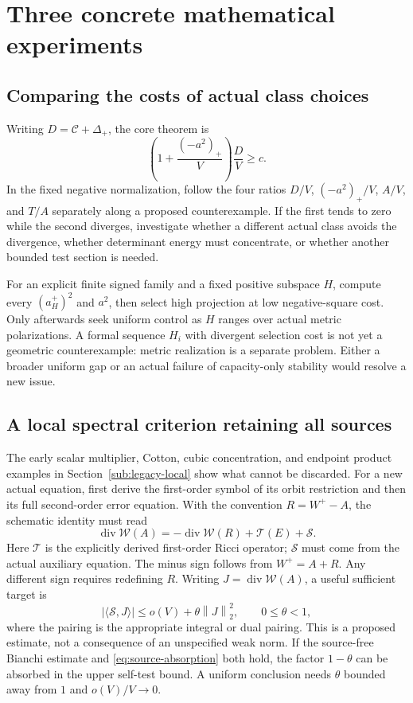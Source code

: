 \documentclass[11pt,a4paper]{article}
\theoremstyle{definition}
\theoremstyle{remark}
\DeclareMathOperator{\diver}{div}
\newcommand{\norm}[1]{\left\|#1\right\|}
\numberwithin{equation}{section}
\begin{document}
\section{Three concrete mathematical experiments}\label{sec:experiments}
\subsection{Comparing the costs of actual class choices}\label{sub:experiment-A}
Writing $D=\mathcal C+\Delta_+$, the core theorem is
\[
          \left(1+\frac{(-a^2)_+}{V}\right)\frac DV\ge c.
\]
In the fixed negative normalization, follow the four ratios
$D/V$, $(-a^2)_+/V$, $A/V$, and $T/A$ separately along a proposed
counterexample. If the first tends to zero while the second diverges,
investigate whether a different actual class avoids the divergence,
whether determinant energy must concentrate, or whether another bounded
test section is needed.

For an explicit finite signed family and a fixed positive subspace $H$,
compute every $(a_H^+)^2$ and $a^2$, then select high projection at low
negative-square cost. Only afterwards seek uniform control as $H$
ranges over actual metric polarizations. A formal sequence $H_i$ with
divergent selection cost is not yet a geometric counterexample: metric
realization is a separate problem. Either a broader uniform gap or an
actual failure of capacity-only stability would resolve a new issue.

\subsection{A local spectral criterion retaining all sources}\label{sub:experiment-B}
The early scalar multiplier, Cotton, cubic concentration, and endpoint
product examples in Section~\ref{sub:legacy-local} show what cannot be
discarded. For a new actual equation, first derive the first-order symbol
of its orbit restriction and then its full second-order error equation.
With the convention $R=W^+-A$, the schematic identity must read
\begin{equation}\label{eq:source-identity}
 \diver\mathcal W(A)
       =-\diver\mathcal W(R)+\mathcal T(E)+\mathcal S.
\end{equation}
Here $\mathcal T$ is the explicitly derived first-order Ricci operator;
$\mathcal S$ must come from the actual auxiliary equation. The minus
sign follows from $W^+=A+R$. Any different sign requires redefining $R$.
Writing $J=\diver\mathcal W(A)$, a useful sufficient target is
\begin{equation}\label{eq:source-absorption}
 |\langle\mathcal S,J\rangle|\le o(V)+\theta\norm J_2^2,
                      \qquad 0\le\theta<1,
\end{equation}
where the pairing is the appropriate integral or dual pairing. This is
a proposed estimate, not a consequence of an unspecified weak norm.
If the source-free Bianchi estimate and \eqref{eq:source-absorption}
both hold, the factor $1-\theta$ can be absorbed in the upper self-test
bound. A uniform conclusion needs $\theta$ bounded away from $1$ and
$o(V)/V\to0$.
\end{document}
